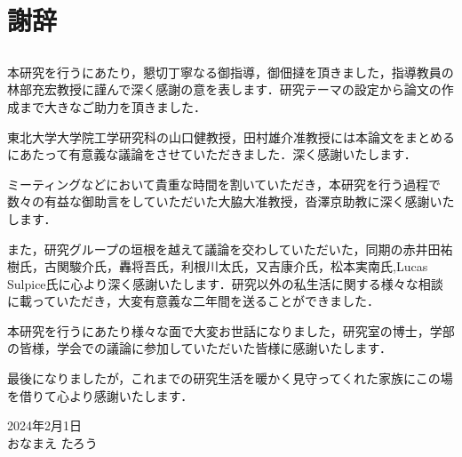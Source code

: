 \cleardoublepage %
\chapter*{謝辞}

\section*{}
本研究を行うにあたり，懇切丁寧なる御指導，御佃撻を頂きました，指導教員の林部充宏教授に謹んで深く感謝の意を表します．研究テーマの設定から論文の作成まで大きなご助力を頂きました．

東北大学大学院工学研究科の山口健教授，田村雄介准教授には本論文をまとめるにあたって有意義な議論をさせていただきました．深く感謝いたします．

ミーティングなどにおいて貴重な時間を割いていただき，本研究を行う過程で数々の有益な御助言をしていただいた大脇大准教授，沓澤京助教に深く感謝いたします．

また，研究グループの垣根を越えて議論を交わしていただいた，同期の赤井田祐樹氏，古関駿介氏，轟将吾氏，利根川太氏，又吉康介氏，松本実南氏,Lucas Sulpice氏に心より深く感謝いたします．研究以外の私生活に関する様々な相談に載っていただき，大変有意義な二年間を送ることができました．

本研究を行うにあたり様々な面で大変お世話になりました，研究室の博士，学部の皆様，学会での議論に参加していただいた皆様に感謝いたします．

最後になりましたが，これまでの研究生活を暖かく見守ってくれた家族にこの場を借りて心より感謝いたします．

\begin{flushright}
2024年2月1日\\
おなまえ たろう
\end{flushright}
